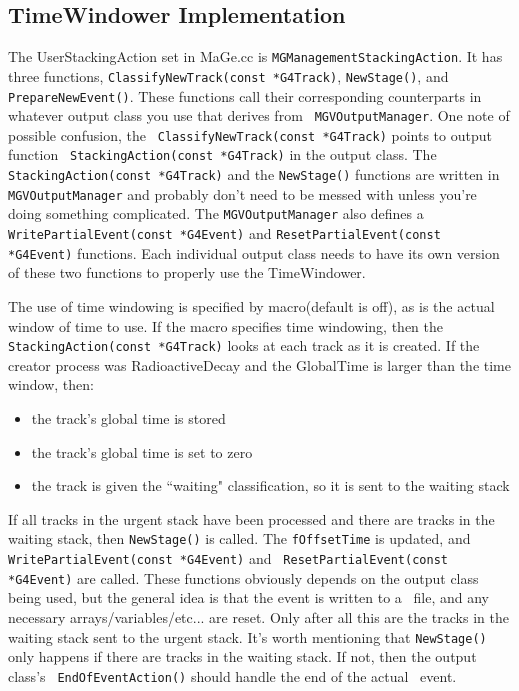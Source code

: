 \subsection{TimeWindower Implementation}

The UserStackingAction set in MaGe.cc is {\tt MGManagementStackingAction}.  It
has three functions, {\tt ClassifyNewTrack(const *G4Track)}, {\tt NewStage()},
and {\tt PrepareNewEvent()}.  These functions call their corresponding
counterparts in whatever output class you use that derives from {\tt
MGVOutputManager}.  One note of possible confusion, the {\tt
ClassifyNewTrack(const *G4Track)} points to output function {\tt
StackingAction(const *G4Track)} in the output class.  The {\tt
StackingAction(const *G4Track)} and the {\tt NewStage()} functions are written
in {\tt MGVOutputManager} and probably don't need to be messed with unless
you're doing something complicated.  The {\tt MGVOutputManager} also defines a
{\tt WritePartialEvent(const *G4Event)} and {\tt ResetPartialEvent(const
*G4Event)} functions.  Each individual output class needs to have its own
version of these two functions to properly use the TimeWindower.

The use of time windowing is specified by macro(default is off), as is the actual window of time to use.
If the macro specifies time windowing, then the {\tt StackingAction(const
*G4Track)} looks at each track as it is created.  If the creator process was
RadioactiveDecay and the GlobalTime is larger than the time window, then:

\begin{itemize}
\item the track's global time is stored
\item the track's global time is set to zero
\item the track is given the ``waiting" classification, so it is sent to the waiting stack
\end{itemize}

If all tracks in the urgent stack have been processed and there are tracks in
the waiting stack, then {\tt NewStage()} is called.  The {\tt fOffsetTime} is
updated, and {\tt WritePartialEvent(const *G4Event)} and {\tt
ResetPartialEvent(const *G4Event)} are called.  These functions obviously
depends on the output class being used, but the general idea is that the event
is written to a \rootv \ file, and any necessary arrays/variables/etc... are reset.
Only after all this are the tracks in the waiting stack sent to the urgent
stack.  It's worth mentioning that {\tt NewStage()} only happens if there are
tracks in the waiting stack.  If not, then the output class's {\tt
EndOfEventAction()} should handle the end of the actual \geant \ event.


